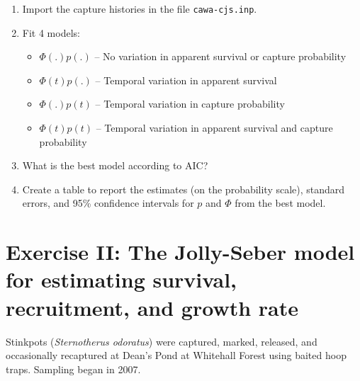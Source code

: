 \documentclass[12pt]{article}\usepackage[]{graphicx}\usepackage[]{xcolor}
\begin{document}
\begin{enumerate}
  \item Import the capture histories in the file
    \texttt{cawa-cjs.inp}.
  \item Fit 4 models:
    \begin{itemize}
      \item $\Phi(.)p(.)$ -- No variation in apparent survival or capture probability
      \item $\Phi(t)p(.)$ -- Temporal variation in apparent survival
      \item $\Phi(.)p(t)$ -- Temporal variation in capture probability
      \item $\Phi(t)p(t)$ -- Temporal variation in apparent survival and capture probability
    \end{itemize}
  \item What is the best model according to AIC?
  \item Create a table to report the estimates (on the probability
    scale), standard errors, and 95\% confidence intervals for $p$ and
    $\Phi$ from the best model. 
\end{enumerate}

  
\clearpage

\section*{\large  Exercise II: The Jolly-Seber model
  for estimating survival, recruitment, and growth rate}



Stinkpots ({\it Sternotherus odoratus}) were captured, marked,
released, and occasionally recaptured at Dean's Pond at Whitehall
Forest using baited hoop traps. Sampling began in 2007. 



\end{document}
